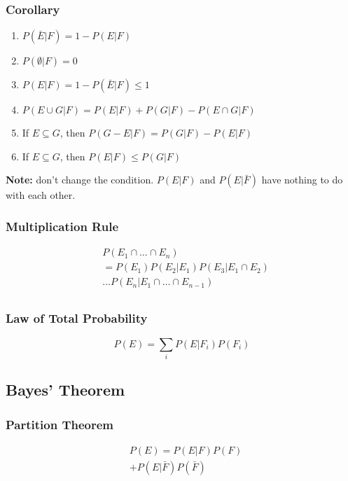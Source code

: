 \subsubsection{Corollary}

\begin{enumerate}
    \item $P(\bar{E}|F) = 1 - P(E|F)$
    \item $P(\emptyset|F) = 0$
    \item $P(E|F) = 1 - P(\bar{E}|F) \leq 1$
    \item $P(E \cup G|F) = P(E|F) + P(G|F) - P(E \cap G|F)$
    \item If $E \subseteq G$, then $P(G-E|F)=P(G|F)-P(E|F)$
    \item If $E \subseteq G$, then $P(E|F) \leq P(G|F)$
\end{enumerate}

\textbf{Note:} don't change the condition. $P(E|F)$ and $P(E|\bar{F})$ have nothing to do with each other.

\subsubsection{Multiplication Rule}

\begin{align*}
     & P(E_1 \cap \dots \cap E_n)               \\
     & = P(E_1)P(E_2|E_1)P(E_3|E_1 \cap E_2)    \\
     & \dots P(E_n|E_1 \cap \dots \cap E_{n-1}) \\
\end{align*}

\subsubsection{Law of Total Probability}

$$ P(E) = \sum_{i} P(E|F_i)P(F_i) $$

\subsection{Bayes' Theorem}

\subsubsection{Partition Theorem}

\begin{align*}
     & P(E) = P(E|F)P(F)        \\
     & + P(E|\bar{F})P(\bar{F}) \\
\end{align*}

